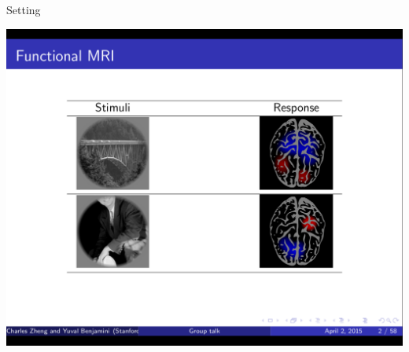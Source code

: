 \documentclass[final]{beamer}
\newlength{\onecolwid}
\begin{document}
\begin{frame}[t]
\begin{columns}[t]
\begin{column}{\onecolwid}
\begin{block}{Setting}
\begin{center}
\includegraphics[scale = 0.5, trim=3in 3in 3in 3in, clip]{screen1.png}
\end{center}
\end{block}


\end{column}
\end{columns}
\end{frame}
\end{document}
